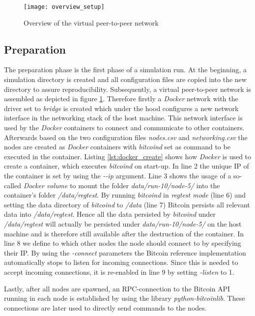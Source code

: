 \begin{figure}[t]
\texttt{[image: overview\_setup]}
\centering
\caption{Overview of the virtual peer-to-peer network}
\label{fig:overview}
\end{figure}

\subsection{Preparation}

The preparation phase is the first phase of a simulation run.
At the beginning, a simulation directory is created and all configuration files are copied into the new directory to assure reproducibility.
Subsequently, a virtual peer-to-peer network is assembled as depicted in figure \ref{fig:overview}.
Therefore firstly a \textit{Docker} network with the driver set to \textit{bridge} is created which under the hood configures a new network interface in the networking stack of the host machine.
This network interface is used by the \textit{Docker} containers to connect and communicate to other containers.
Afterwards based on the two configuration files \textit{nodes.csv} and \textit{networking.csv} the nodes are created as \textit{Docker} containers with \textit{bitcoind} set as command to be executed in the container.
Listing \ref{lst:docker_create} shows how \textit{Docker} is used to create a container, which executes \textit{bitcoind} on start-up.
In line 2 the unique IP of the container is set by using the \textit{-{}-ip} argument.
Line 3 shows the usage of a so-called \textit{Docker volume} to mount the folder \textit{data/run-10/node-5/} into the container's folder \textit{/data/regtest}.
By running \textit{bitcoind} in \textit{regtest mode} (line 6) and setting the data directory of \textit{bitcoind} to \textit{/data} (line 7) Bitcoin persists all relevant data into \textit{/data/regtest}.
Hence all the data persisted by \textit{bitcoind} under \textit{/data/regtest} will actually be persisted under \textit{data/run-10/node-5/} on the host machine and is therefore still available after the destruction of the container.
In line 8 we define to which other nodes the node should connect to by specifying their IP.
By using the \textit{-connect} parameters the Bitcoin reference implementation automatically stops to listen for incoming connections.
Since this is needed to accept incoming connections, it is re-enabled in line 9 by setting \textit{-listen} to 1.

Lastly, after all nodes are spawned, an RPC-connection to the Bitcoin API running in each node is established by using the library \textit{python-bitcoinlib}.
These connections are later used to directly send commands to the nodes.


